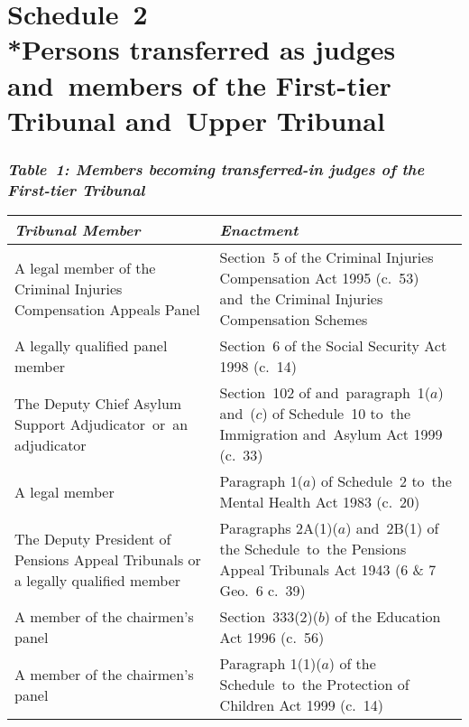 \documentclass[12pt,a4paper]{article}
\begin{document}
\vfill

\part[Schedule~2 --- Persons transferred as judges and~members of the First-tier Tribunal and~Upper Tribunal]{Schedule~2\\*Persons transferred as judges and~members of the First-tier Tribunal and~Upper Tribunal}

\renewcommand\parthead{--- Schedule~2}

\section*{\itshape\sloppy Table~1: Members becoming transferred-in judges of the First-tier Tribunal}

{\noindent{}
\begin{longtable}{p{151.4971pt}p{214.49799pt}}
\hline
\itshape Tribunal	Member & \itshape Enactment\\
\hline
\endhead
\hline
\endlastfoot
A legal member of the Criminal Injuries Compensation Appeals Panel	&Section~5 of the Criminal Injuries Compensation Act 1995 (c.~53) and~the Criminal Injuries Compensation Schemes\\
A legally qualified panel member	&Section~6 of the Social Security Act 1998 (c.~14)\\
The Deputy Chief Asylum Support Adjudicator~or~an adjudicator	&Section~102 of and~paragraph~1($a$)  and~($c$)  of Schedule~10 to~the Immigration and~Asylum Act 1999 (c.~33)\\
A legal member	&Paragraph 1($a$)  of Schedule~2 to~the Mental Health Act 1983 (c.~20)\\
The Deputy President of Pensions Appeal Tribunals or a legally qualified member	&Paragraphs 2A(1)($a$)  and~2B(1) of the Schedule~to~the Pensions Appeal Tribunals Act 1943 (6 \& 7 Geo.~6 c.~39)\\
A member of the chairmen’s panel	&Section~333(2)($b$)  of the Education Act 1996 (c.~56)\\
A member of the chairmen’s panel	&Paragraph 1(1)($a$)  of the Schedule~to~the Protection of Children Act 1999 (c.~14)\\
\end{longtable}

}
\end{document}
